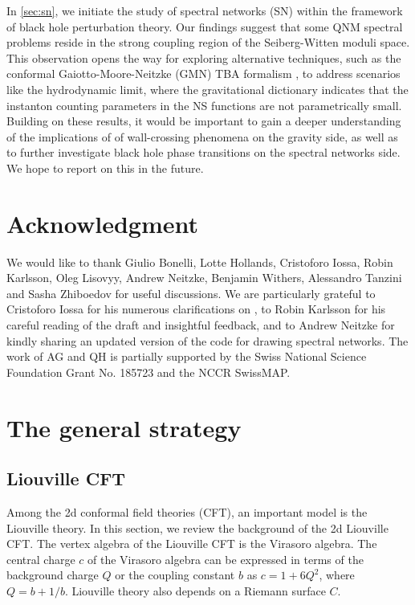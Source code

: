 \documentclass[11pt]{article}
\numberwithin{equation}{section}
\begin{document}
In \autoref{sec:sn}, we initiate the study of spectral networks (SN) within the framework of black hole perturbation theory. Our findings suggest that some QNM spectral problems reside in the strong coupling region of the Seiberg-Witten moduli space. This observation opens the way for exploring alternative techniques, such as the conformal Gaiotto-Moore-Neitzke (GMN) TBA formalism \cite{Gaiotto:2009hg,Gaiotto:2014bza}, to address scenarios like the hydrodynamic limit, where the gravitational dictionary indicates that the instanton counting parameters in the NS functions are not parametrically small. 
Building on these results, it would be important to gain a deeper understanding of the implications of of wall-crossing phenomena on the gravity side, as well as to further investigate black hole phase transitions on the spectral networks side. We hope to report on this in the future. 






\section*{Acknowledgment}
We would like to thank Giulio Bonelli, Lotte Hollands, Cristoforo Iossa, Robin Karlsson, Oleg Lisovyy, Andrew Neitzke, Benjamin Withers, Alessandro Tanzini and Sasha Zhiboedov for useful
discussions. We are particularly grateful to Cristoforo Iossa for his numerous clarifications on \cite{Bonelli:2022ten}, to Robin Karlsson for his careful reading of the draft and insightful feedback, and to Andrew Neitzke for kindly  sharing an updated version of the code for drawing spectral networks.
The work of AG and QH is partially supported by the Swiss National Science Foundation Grant No. 185723 and the NCCR SwissMAP.



\section{The general strategy}\label{sec2}
\subsection{Liouville CFT}
\label{Liouville}



Among the 2d conformal field theories (CFT), an important model is the Liouville theory. In this section, we review the background of the 2d Liouville CFT. The vertex algebra of the Liouville CFT is the Virasoro algebra. The central charge $c$ of the Virasoro algebra can be expressed in terms of the background charge $Q$ or the coupling constant $b$ as $c=1+6Q^2$, where $Q=b+1/b$. Liouville theory also depends on a Riemann surface $C$.
%
\end{document}
